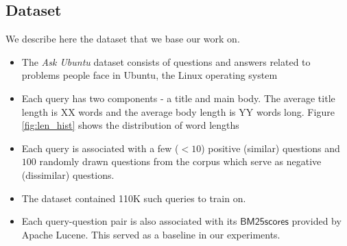\documentclass{sigkddExp}
\begin{document}
\subsection{Dataset}
We describe here the dataset that we base our work on.
\begin{itemize}[topsep=0pt,itemsep=-1ex,partopsep=1ex,parsep=1ex]
\item The \textit{Ask Ubuntu} dataset consists of questions and answers related to problems people face in Ubuntu, the Linux operating system
\item Each query has two components - a title and main body. The average title length is {\color{red} XX} words and the average body length is {\color{red} YY words} long. Figure \ref{fig:len_hist} shows the distribution of word lengths
\item Each query is associated with a few ($<10$) positive (similar) questions and $100$ randomly drawn questions from the corpus which serve as negative (dissimilar) questions.
\item The dataset contained 110K such queries to train on.
\item Each query-question pair is also associated with its $\mathsf{BM25 scores}$ provided by Apache Lucene. This served as a baseline in our experiments.
\end{itemize}
\end{document}
